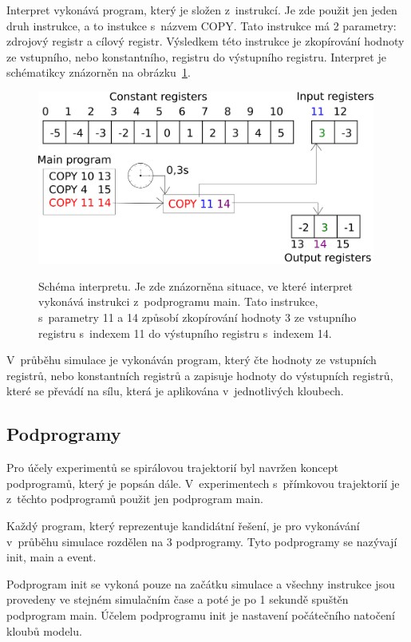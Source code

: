 Interpret vykonává program, který je složen z~instrukcí.
Je zde použit jen jeden druh instrukce, a to instukce s~názvem COPY\@.
Tato instrukce má 2 parametry: zdrojový registr a cílový registr.
Výsledkem této instrukce je zkopírování hodnoty ze vstupního, nebo konstantního, registru do výstupního registru.
Interpret je schématikcy znázorněn na obrázku~\ref{fig:interpret}.

\begin{figure}[h]
    \centering
    {\includegraphics[width=30em]{obrazky/interpret.png}}
    \caption[Schéma interpretu]{
    Schéma interpretu.
    Je zde znázorněna situace, ve které interpret vykonává instrukci z~podprogramu main.
    Tato instrukce, s~parametry 11 a 14 způsobí zkopírování hodnoty 3 ze vstupního registru s~indexem 11 do výstupního registru s~indexem 14.
    }
    \label{fig:interpret}
\end{figure}

V~průběhu simulace je vykonáván program, který čte hodnoty ze vstupních registrů, nebo konstantních registrů a zapisuje hodnoty do výstupních registrů, které se převádí na sílu, která je aplikována v~jednotlivých kloubech.

\subsection{Podprogramy}

Pro účely experimentů se spirálovou trajektorií byl navržen koncept podprogramů, který je popsán dále.
V~experimentech s~přímkovou trajektorií je z~těchto podprogramů použit jen podprogram main.

Každý program, který reprezentuje kandidátní řešení, je pro vykonávání v~průběhu simulace rozdělen na 3 podprogramy.
Tyto podprogramy se nazývají init, main a event.

Podprogram init se vykoná pouze na začátku simulace a všechny instrukce jsou provedeny ve stejném simulačním čase a poté je po 1 sekundě spuštěn podprogram main.
Účelem podprogramu init je nastavení počátečního natočení kloubů modelu.


